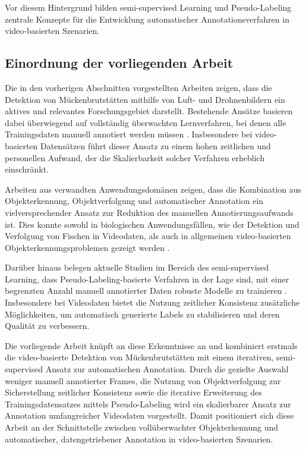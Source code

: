 Vor diesem Hintergrund bilden semi-supervised Learning und Pseudo-Labeling zentrale Konzepte für die Entwicklung automatischer Annotationsverfahren in video-basierten Szenarien.

\subsection{Einordnung der vorliegenden Arbeit}

Die in den vorherigen Abschnitten vorgestellten Arbeiten zeigen, dass die Detektion von
Mückenbrutstätten mithilfe von Luft- und Drohnenbildern ein aktives und relevantes
Forschungsgebiet darstellt. Bestehende Ansätze basieren dabei überwiegend auf vollständig
überwachten Lernverfahren, bei denen alle Trainingsdaten manuell annotiert werden müssen
\cite{passos2023augmented, knoblauch2023breeding}. Insbesondere bei video-basierten
Datensätzen führt dieser Ansatz zu einem hohen zeitlichen und personellen Aufwand, der
die Skalierbarkeit solcher Verfahren erheblich einschränkt.

Arbeiten aus verwandten Anwendungsdomänen zeigen, dass die Kombination aus
Objekterkennung, Objektverfolgung und automatischer Annotation ein vielversprechender
Ansatz zur Reduktion des manuellen Annotierungsaufwands ist. Dies konnte sowohl in
biologischen Anwendungsfällen, wie der Detektion und Verfolgung von Fischen in Videodaten,
als auch in allgemeinen video-basierten Objekterkennungsproblemen gezeigt werden
\cite{fishtracking2024, wojke2017deepsort}.

Darüber hinaus belegen aktuelle Studien im Bereich des semi-supervised Learning, dass
Pseudo-Labeling-basierte Verfahren in der Lage sind, mit einer begrenzten Anzahl manuell
annotierter Daten robuste Modelle zu trainieren \cite{lee2013pseudo, li2022ssvod}.
Insbesondere bei Videodaten bietet die Nutzung zeitlicher Konsistenz zusätzliche
Möglichkeiten, um automatisch generierte Labels zu stabilisieren und deren Qualität zu
verbessern.

Die vorliegende Arbeit knüpft an diese Erkenntnisse an und kombiniert erstmals die
video-basierte Detektion von Mückenbrutstätten mit einem iterativen, semi-supervised
Ansatz zur automatischen Annotation. Durch die gezielte Auswahl weniger manuell
annotierter Frames, die Nutzung von Objektverfolgung zur Sicherstellung zeitlicher
Konsistenz sowie die iterative Erweiterung des Trainingsdatensatzes mittels
Pseudo-Labeling wird ein skalierbarer Ansatz zur Annotation umfangreicher Videodaten
vorgestellt. Damit positioniert sich diese Arbeit an der Schnittstelle zwischen
vollüberwachter Objekterkennung und automatischer, datengetriebener Annotation in
video-basierten Szenarien.

